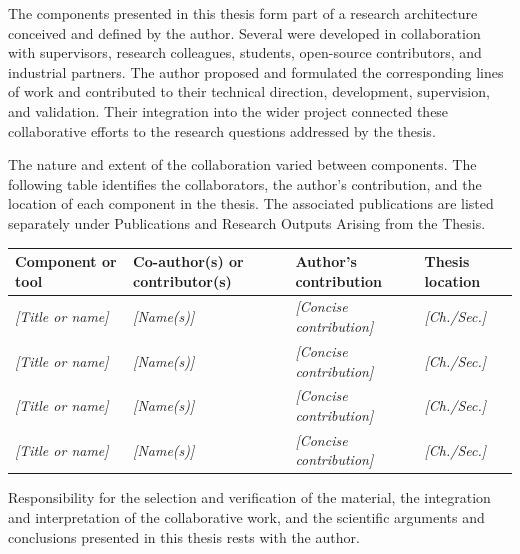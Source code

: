 
The components presented in this thesis form part of a research architecture conceived and defined by the author. Several were developed in collaboration with supervisors, research colleagues, students, open-source contributors, and industrial partners. The author proposed and formulated the corresponding lines of work and contributed to their technical direction, development, supervision, and validation. Their integration into the wider project connected these collaborative efforts to the research questions addressed by the thesis.

The nature and extent of the collaboration varied between components. The following table identifies the collaborators, the author's contribution, and the location of each component in the thesis. The associated publications are listed separately under Publications and Research Outputs Arising from the Thesis.

\vspace{6mm}

\begingroup
\renewcommand{\arraystretch}{1.35}
\small
\noindent
\begin{tabularx}{\textwidth}{@{}p{}p{}Xp{}@{}}
\hline
\textbf{Component or tool} & \textbf{Co-author(s) or contributor(s)} & \textbf{Author's contribution} & \textbf{Thesis location} \\
\hline
\textit{[Title or name]} & \textit{[Name(s)]} & \textit{[Concise contribution]} & \textit{[Ch./Sec.]} \\
\textit{[Title or name]} & \textit{[Name(s)]} & \textit{[Concise contribution]} & \textit{[Ch./Sec.]} \\
\textit{[Title or name]} & \textit{[Name(s)]} & \textit{[Concise contribution]} & \textit{[Ch./Sec.]} \\
\textit{[Title or name]} & \textit{[Name(s)]} & \textit{[Concise contribution]} & \textit{[Ch./Sec.]} \\
\hline
\end{tabularx}
\endgroup

\vspace{3mm}
Responsibility for the selection and verification of the material, the integration and interpretation of the collaborative work, and the scientific arguments and conclusions presented in this thesis rests with the author.
